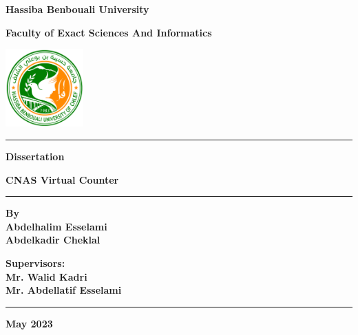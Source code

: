 \documentclass[12pt]{report}
\begin{document}
\begin{titlepage}
    \centering
    
    \textbf{\Huge Hassiba Benbouali University}
    
    \vspace{0.5cm}
    
    \textbf{\LARGE Faculty of Exact Sciences And Informatics}
    
    \vspace{1cm}
    
    \includegraphics[width=3cm]{university-logo.png}
    
    \vspace{2cm}
    
    \rule{\linewidth}{1pt} %
    
    \vspace{0.5cm}
    
    \textbf{\LARGE Dissertation}
    
    \vspace{0.5cm}
    
    \textbf{\huge CNAS Virtual Counter}
    
    \vspace{0.5cm}
    
    \rule{\linewidth}{1pt} %
    
    \begin{minipage}{0.5\textwidth}
        \vspace{8cm}
        \begin{flushleft}
        \textbf{\Large By}\\
        \textbf{\Large Abdelhalim Esselami}\\
        \textbf{\Large Abdelkadir Cheklal}
        \end{flushleft}
        \end{minipage}%
        \begin{minipage}{0.5\textwidth}
        \vspace{8cm}
        \begin{flushright}
        \textbf{\Large Supervisors:}\\
        \textbf{\Large Mr. Walid Kadri}\\
        \textbf{\Large Mr. Abdellatif Esselami}
        \end{flushright}
        \end{minipage}
    
    \vspace{1cm}
    
    \rule{\linewidth}{1pt} %
    
    \vfill
    
    \textbf{\Large May 2023}
    
    \end{titlepage}
\end{document}
